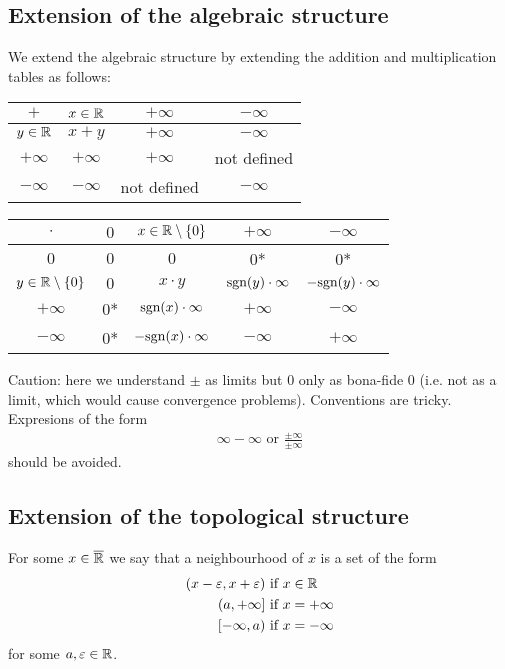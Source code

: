 \subsection{Extension of the algebraic structure}

We extend the algebraic structure by extending the addition and multiplication tables as follows:

\begin{center}
	\begin{tabular}{c|ccc}
		$+$ & $x\in \mathbb{R}$ & $+\infty$ & $-\infty$ \\ 
		\hline 
		$y\in \mathbb{R}$ & $x+y$ & $+\infty$ & $-\infty$ \\ 
		$+\infty$ & $+\infty$ & $+\infty$ & not defined \\ 
		$-\infty$ & $-\infty$ & not defined & $-\infty$ \\ 
	\end{tabular} 
\end{center}

\begin{center}
	\begin{tabular}{c|cccc}
		$\cdot$ & $0$ & $x \in \mathbb{R}\setminus\{0\}$ & $+\infty$ & $-\infty$ \\ 
		\hline 
		$0$ & $0$ & $0$ & $0$* & $0$* \\ 
		$y \in \mathbb{R}\setminus\{0\}$ & $0$ & $x \cdot y$ & $\text{sgn}(y)\cdot \infty$ & $-\text{sgn}(y)\cdot \infty$ \\ 
		$+\infty$ & $0$* & $\text{sgn}(x)\cdot \infty$ & $+\infty$ & $-\infty$ \\ 
		$-\infty$ & $0$* & $-\text{sgn}(x)\cdot \infty$ & $-\infty$ & $+\infty$ \\ 
	\end{tabular} 
\end{center}

Caution: here we understand $\pm$ as limits but $0$ only as bona-fide $0$ (i.e. not as a limit, which would cause convergence problems). Conventions are tricky. Expresions of the form
\begin{align*}
	\infty - \infty \text{ or } \frac{\pm \infty}{\pm \infty}
\end{align*}
should be avoided.

\subsection{Extension of the topological structure}

\begin{dfn}[Neighbourhoods in $\Rb$]
	For some $x \in {\overline{\mathbb{R}}}$ we say that a neighbourhood of $x$ is a set of the form
	\begin{align*}
		(x - \varepsilon, x + \varepsilon) &\text{ if } x \in \mathbb{R}\\
		(a, +\infty] &\text{ if } x = +\infty \\
		[-\infty, a) &\text{ if } x = -\infty
	\end{align*}
	for some $a, \varepsilon \in \mathbb{R}$.
\end{dfn}

